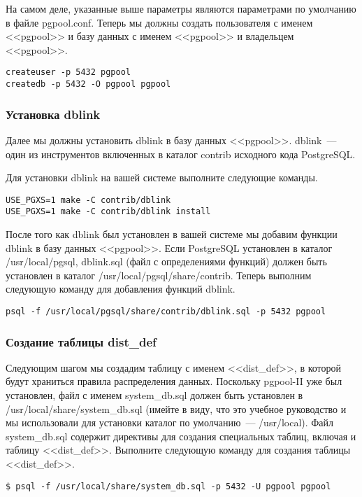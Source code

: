 На самом деле, указанные выше параметры являются параметрами по умолчанию в файле pgpool.conf. Теперь мы должны 
создать пользователя с именем <<pgpool>> и базу данных с именем <<pgpool>> и владельцем <<pgpool>>.
\begin{lstlisting}[label=lst:pgpool27,caption=Настройка SystemDB]
createuser -p 5432 pgpool
createdb -p 5432 -O pgpool pgpool
\end{lstlisting}

\subsubsection{Установка dblink}
Далее мы должны установить dblink в базу данных <<pgpool>>. dblink~--- один из инструментов включенных в каталог 
contrib исходного кода PostgreSQL.

Для установки dblink на вашей системе выполните следующие команды.
\begin{lstlisting}[label=lst:pgpool28,caption=Установка dblink]
USE_PGXS=1 make -C contrib/dblink
USE_PGXS=1 make -C contrib/dblink install
\end{lstlisting}

После того как dblink был установлен в вашей системе мы добавим функции dblink в базу данных <<pgpool>>. Если PostgreSQL 
установлен в каталог /usr/local/pgsql, dblink.sql (файл с определениями функций) должен быть установлен в каталог 
/usr/local/pgsql/share/contrib. Теперь выполним следующую команду для добавления функций dblink.
\begin{lstlisting}[label=lst:pgpool29,caption=Установка dblink]
psql -f /usr/local/pgsql/share/contrib/dblink.sql -p 5432 pgpool
\end{lstlisting}

\subsubsection{Создание таблицы dist\_def}
Следующим шагом мы создадим таблицу с именем <<dist\_def>>, в которой будут храниться правила распределения данных. 
Поскольку pgpool-II уже был установлен, файл с именем system\_db.sql должен быть установлен в 
/usr/local/share/system\_db.sql (имейте в виду, что это учебное руководство и мы использовали для установки каталог 
по умолчанию~--- /usr/local). Файл system\_db.sql содержит директивы для создания специальных таблиц, включая и 
таблицу <<dist\_def>>. Выполните следующую команду для создания таблицы <<dist\_def>>.
\begin{lstlisting}[label=lst:pgpool30,caption=Создание таблицы dist\_def]
$ psql -f /usr/local/share/system_db.sql -p 5432 -U pgpool pgpool
\end{lstlisting}

